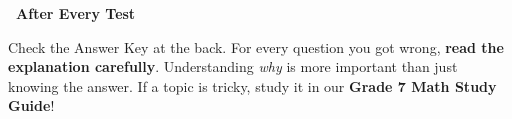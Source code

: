 {\vspace{2mm}

\begin{tcolorbox}[
    enhanced,
    colback=funPurple!8,
    colframe=funPurple!50,
    arc=10pt,
    boxrule=1.5pt,
    left=5mm, right=5mm, top=3mm, bottom=3mm,
]
    \begin{minipage}[c]{0.08\linewidth}
        \centering
        \iconOwl[1.2cm]
    \end{minipage}%
    \hfill
    \begin{minipage}[c]{0.88\linewidth}
        \textcolor{funPurpleDark}{\textbf{\faQuoteLeft~After Every Test~\faQuoteRight}}

        \medskip
        \small Check the Answer Key at the back. For every question you got
        wrong, \textbf{read the explanation carefully}. Understanding \textit{why}
        is more important than just knowing the answer. If a topic is tricky,
        study it in our \textbf{Grade 7 Math Study Guide}!
    \end{minipage}
\end{tcolorbox}



}

\newpage
